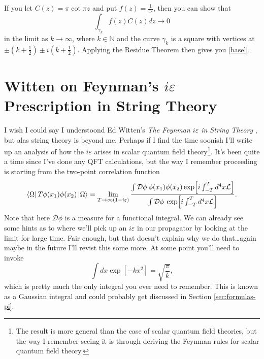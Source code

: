 \documentclass[manuscript,screen,nonacm]{acmart}
\begin{document}
If you let $C(z)=\pi\cot{\pi z}$ and put $f(z)=\frac{1}{z^2}$, then you can show that
\begin{equation}
	\int_{\gamma_k}f(z)C(z)dz \rightarrow 0
\end{equation}
in the limit as $k \rightarrow \infty$, where $k \in \mathbb{N}$ and the curve
$\gamma_k$ is a square with vertices at $\pm(k+\frac{1}{2})\pm
i(k+\frac{1}{2})$. Applying the Residue Theorem then gives you \eqref{basel}.

\section{Witten on Feynman's $i\varepsilon$ Prescription in String Theory}

I wish I could say I understoond Ed Witten's \emph{The Feynman $i\varepsilon$
in String Theory} \cite{witten2013feynman}, but alas string theory is beyond
me. Perhaps if I find the time soonish I'll write up an analysis of how the
$i\varepsilon$ arises in scalar quantum field theory\footnote{The result is
more general than the case of scalar quantum field theories, but the way I
remember seeing it is through deriving the Feynman rules for scalar quantum
field theory.}. It's been quite a time since I've done any QFT calculations,
but the way I remember proceeding is starting from the two-point correlation
function\cite{Peskin:1995ev}
\begin{equation}
	\bra{\Omega}T\phi(x_1)\phi(x_2)\ket{\Omega}
	= \lim_{T\rightarrow \infty(1-i\varepsilon)}\frac{
		\int\mathcal{D}\phi \: \phi(x_1)\phi(x_2)\exp[i\int_{-T}^{T}d^4x\mathcal{L}]}{
		\int\mathcal{D}\phi \: \exp[i\int_{-T}^{T}d^4x\mathcal{L}]
	}.
\end{equation}
Note that here $\mathcal{D}\phi$ is a measure for a functional integral. We can
already see some hints as to where we'll pick up an $i\varepsilon$ in our
propagator by looking at the limit for large time. Fair enough, but that
doesn't explain why we do that\ldots again maybe in the future I'll revist this
some more. At some point you'll need to invoke
\begin{equation}
	\int dx \exp[-kx^2] = \sqrt{\frac{\pi}{k}},
\end{equation}
which is pretty much the only integral you ever need to remember. This is known
as a Gaussian integral and could probably get discussed in Section
\ref{sec:formulas-pi}.



\end{document}
